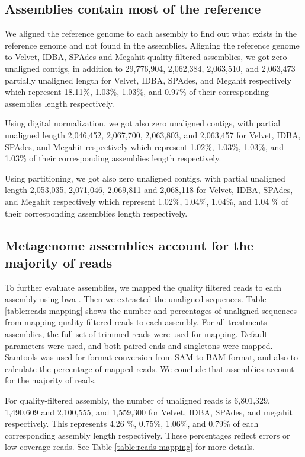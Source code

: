 \subsection*{Assemblies contain most of the reference} 
We aligned the reference genome to each assembly to find out what exists in the reference genome and not found in the assemblies. 
Aligning the reference genome to Velvet, IDBA, SPAdes and Megahit quality filtered assemblies, we got zero unaligned contigs, in addition to 29,776,904, 2,062,384, 2,063,510, and 2,063,473 partially unaligned length for Velvet, IDBA, SPAdes, and Megahit respectively which represent 18.11\%, 1.03\%, 1.03\%, and 0.97\% of their corresponding assemblies length respectively. 


Using digital normalization, we got also zero unaligned contigs, with partial unaligned length 2,046,452, 2,067,700, 2,063,803, and 2,063,457 for Velvet, IDBA, SPAdes, and Megahit respectively which represent 1.02\%, 1.03\%, 1.03\%, and 1.03\% of their corresponding assemblies length respectively.


Using partitioning, we got also zero unaligned contigs, with partial unaligned length 2,053,035, 2,071,046, 2,069,811 and 2,068,118 for Velvet, IDBA, SPAdes, and Megahit respectively which represent 1.02\%, 1.04\%, 1.04\%, and 1.04 \% of their corresponding assemblies length respectively. 

\subsection*{Metagenome assemblies account for the majority of reads}
To further evaluate assemblies, we mapped the quality filtered reads to each assembly using bwa \cite{bwa-mem}.  Then we extracted the unaligned sequences. Table \ref{table:reads-mapping} shows the number and percentages of unaligned sequences from mapping quality filtered reads to each assembly. For all treatments assemblies, the full set of trimmed reads were used for mapping. Default parameters were used, and both paired ends and singletons were mapped.  Samtools  \cite{samtools} was used for format conversion from SAM to BAM format, and also to calculate the percentage of mapped reads.  We conclude that assemblies account for the majority of reads.  


For quality-filtered assembly, the number of unaligned reads is 6,801,329, 1,490,609 and 2,100,555, and 1,559,300 for Velvet, IDBA, SPAdes, and megahit respectively. This represents 4.26 \%, 0.75\%, 1.06\%, and 0.79\% of  each corresponding assembly length respectively. These percentages reflect errors or low coverage reads. See Table \ref{table:reads-mapping} for more details. 

